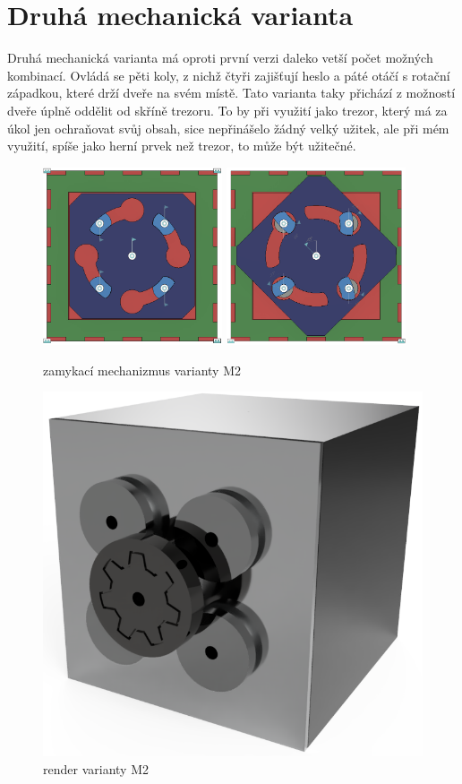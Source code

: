 \section{Druhá mechanická varianta}

Druhá mechanická varianta má oproti první verzi daleko vetší počet možných kombinací.
Ovládá se pěti koly, z nichž čtyři zajišťují heslo a páté otáčí s rotační západkou, které drží dveře na svém místě.
Tato varianta taky přichází z možností dveře úplně oddělit od skříně trezoru. To by při využití jako trezor, který
má za úkol jen ochraňovat svůj obsah, sice nepřinášelo žádný velký užitek, ale při mém využití, spíše jako herní 
prvek než trezor, to může být užitečné.

\begin{figure}[htbp]
    \centering
    \includegraphics[width=150pt]{kapitoly/obrazky/M2/mechanizmus_odemcen.png}
    \includegraphics[width=150pt]{kapitoly/obrazky/M2/mechanizmus_zamceno.png}
    \caption{zamykací mechanizmus varianty M2}
    \label{fig:M2-mechanizmus}
\end{figure}

\begin{figure}[htbp]
    \centering
    \includegraphics[width=\textwidth]{kapitoly/obrazky/M2/predni_render.PNG}
    \caption{render varianty M2}
    \label{fig:M1.0}
\end{figure}


\newpage